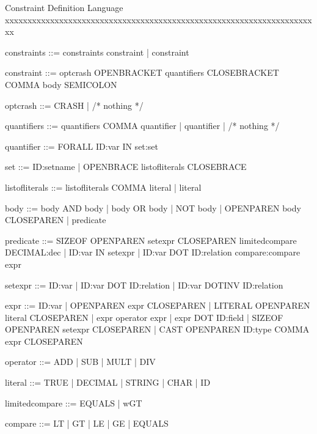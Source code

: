Constraint Definition Language
xxxxxxxxxxxxxxxxxxxxxxxxxxxxxxxxxxxxxxxxxxxxxxxxxxxxxxxxxxxxxxxxxxxxxx

constraints ::= constraints constraint | constraint

constraint ::= optcrash OPENBRACKET quantifiers CLOSEBRACKET COMMA body SEMICOLON
	    
optcrash ::= CRASH | /* nothing */

quantifiers ::= quantifiers COMMA quantifier | quantifier | /* nothing */
	   
quantifier ::= FORALL ID:var IN set:set 

set ::= ID:setname 
      | OPENBRACE listofliterals CLOSEBRACE
    
listofliterals ::= listofliterals COMMA literal | literal

body ::= body AND body
       | body OR body
       | NOT body
       | OPENPAREN body CLOSEPAREN
       | predicate

predicate ::= SIZEOF OPENPAREN setexpr CLOSEPAREN limitedcompare DECIMAL:dec
            | ID:var IN setexpr
            | ID:var DOT ID:relation compare:compare expr

setexpr ::= ID:var
          | ID:var DOT ID:relation
          | ID:var DOTINV ID:relation

expr ::= ID:var 
       | OPENPAREN expr CLOSEPAREN 
       | LITERAL OPENPAREN literal CLOSEPAREN
       | expr operator expr
       | expr DOT ID:field
       | SIZEOF OPENPAREN setexpr CLOSEPAREN
       | CAST OPENPAREN ID:type COMMA expr CLOSEPAREN 

operator ::= ADD | SUB | MULT | DIV 

literal ::= TRUE | DECIMAL | STRING | CHAR | ID

limitedcompare ::= EQUALS | wGT

compare ::= LT | GT | LE | GE | EQUALS



